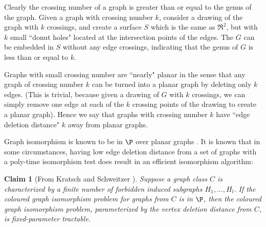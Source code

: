 \documentclass[11pt]{report}
\newtheorem{claim}{Claim}
\begin{document}
Clearly the crossing number of a graph is greater than or equal to the genus of the graph. Given a graph with crossing number $k$, consider a drawing of the graph with $k$ crossings, and create a surface $S$ which is the same as $\Re ^2$, but with $k$ small ``donut holes" located at the intersection points of the edges. The $G$ can be embedded in $S$ without any edge crossings, indicating that the genus of $G$ is less than or equal to $k$.
 
Graphs with small crossing number are ``nearly" planar in the sense that any graph of crossing number $k$ can be turned into a planar graph by deleting only $k$ edges. (This is trivial, because given a drawing of $G$ with $k$ crossings, we can simply remove one edge at each of the $k$ crossing points of the drawing to create a planar graph). Hence we say that graphs with crossing number $k$ have ``edge deletion distance"  $k$ away from planar graphs.

Graph isomorphism is known to be in $\P$ over planar graphs \cite{HopcroftWong74}. It is known that in some circumstances, having low edge deletion distance from a set of graphs with a poly-time isomorphism test does result in an efficient isomorphism algorithm:


\begin{claim} [From Kratsch and Schweitzer \cite{Kratsch09}] Suppose a graph class $C$ is characterized by a finite number of forbidden induced subgraphs
$H_1, . . . , H_l$. If the coloured graph isomorphism problem for graphs from $C$
is in $\P$, then the coloured graph isomorphism problem, parameterized by the vertex
deletion distance from $C$, is fixed-parameter tractable.
\label{clm:kratsch_del_dist}
\end{claim}
\end{document}
